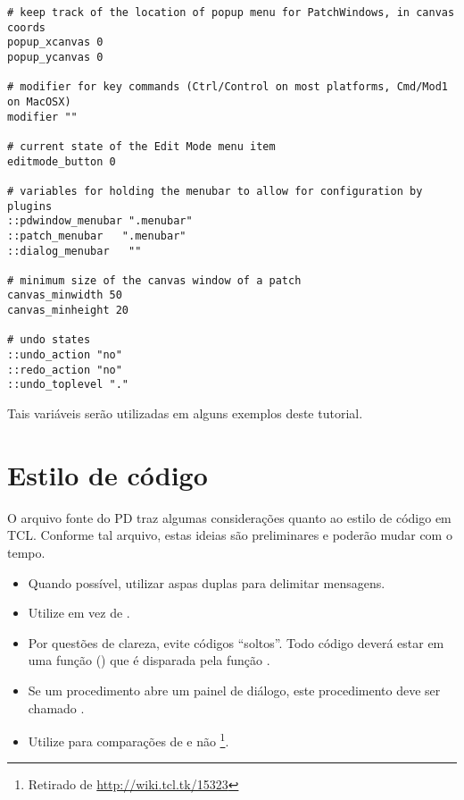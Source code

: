 \begin{lstlisting}[caption={Variáveis globais.},label={code:variavelglobal}]
# keep track of the location of popup menu for PatchWindows, in canvas coords
popup_xcanvas 0
popup_ycanvas 0

# modifier for key commands (Ctrl/Control on most platforms, Cmd/Mod1 on MacOSX)
modifier ""

# current state of the Edit Mode menu item
editmode_button 0

# variables for holding the menubar to allow for configuration by plugins
::pdwindow_menubar ".menubar"
::patch_menubar   ".menubar"
::dialog_menubar   ""

# minimum size of the canvas window of a patch
canvas_minwidth 50
canvas_minheight 20

# undo states
::undo_action "no"
::redo_action "no"
::undo_toplevel "."

\end{lstlisting}

Tais variáveis serão utilizadas em alguns exemplos deste tutorial.

\section{Estilo de código}

O arquivo fonte do PD  traz algumas considerações quanto
ao estilo de código em TCL.
Conforme tal arquivo, estas ideias são preliminares e poderão mudar com o tempo.

\begin{itemize}
   \item Quando possível, utilizar aspas duplas para delimitar mensagens.
   \item Utilize  em vez de .
   \item Por questões de clareza, evite códigos ``soltos''.
   Todo código deverá estar em uma função () que é disparada pela
   função .
   \item Se um procedimento  abre um painel de diálogo, este
   procedimento deve ser chamado .
   \item Utilize  para comparações de  e não
   \courier{== / !=}\footnote{Retirado de \url{http://wiki.tcl.tk/15323}}.
\end{itemize}

